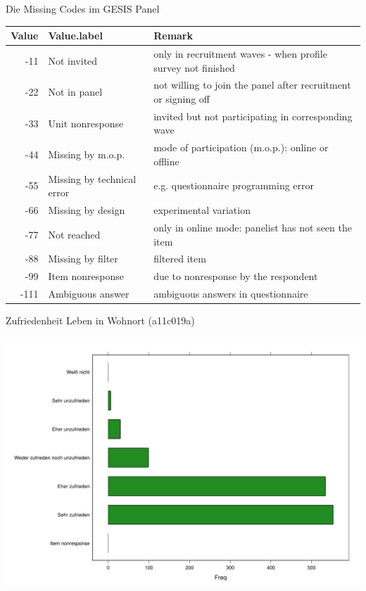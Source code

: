 \documentclass[ignorenonframetext,]{beamer}
\begin{document}
\begin{frame}{Die Missing Codes im GESIS Panel}

\begin{table}[H]
\centering\begingroup\fontsize{7}{9}\selectfont

\begin{tabular}{r|l|l}
\hline
Value & Value.label & Remark\\
\hline
-11 & Not invited & only in recruitment waves - when profile survey not finished\\
\hline
-22 & Not in panel & not willing to join the panel after recruitment or signing off\\
\hline
-33 & Unit nonresponse & invited but not participating in corresponding wave\\
\hline
-44 & Missing by m.o.p. & mode of participation (m.o.p.): online or offline\\
\hline
-55 & Missing by technical error & e.g. questionnaire programming error\\
\hline
-66 & Missing by design & experimental variation\\
\hline
-77 & Not reached & only in online mode: panelist has not seen the item\\
\hline
-88 & Missing by filter & filtered item\\
\hline
-99 & Item nonresponse & due to nonresponse by the respondent\\
\hline
-111 & Ambiguous answer & ambiguous answers in questionnaire\\
\hline
\end{tabular}\endgroup{}
\end{table}

\end{frame}

\begin{frame}{Zufriedenheit Leben in Wohnort (a11c019a)}

\includegraphics{A3_GESISPanel_files/figure-beamer/unnamed-chunk-21-1.pdf}

\end{frame}
\end{document}
